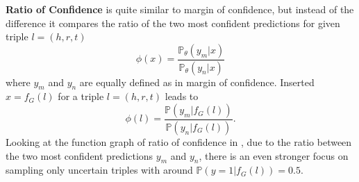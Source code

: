 \textbf{Ratio of Confidence}
is quite similar to margin of confidence, but instead of the difference it compares the ratio of the two most confident predictions for given triple $l = (h,r,t)$
\begin{equation}
    \phi(x) = \frac{\mathds{P}_{\theta}(y_m | x)}{\mathds{P}_{\theta}(y_n |x)}
\end{equation}
where $y_m$ and $y_n$ are equally defined as in margin of confidence.
Inserted $x = f_G(l)$ for a triple $l = (h,r,t)$ leads to
\begin{equation}
    \phi(l) = \frac{\mathds{P}(y_m |  f_G(l))}{\mathds{P}(y_n |f_G(l))}.
\end{equation}
Looking at the function graph of ratio of confidence in , due to the ratio between the two most confident predictions $y_m$ and $y_n$, there is an even stronger focus on sampling only uncertain triples with \ussoftmax around $\mathds{P}(y = 1 | f_G(l)) = 0.5$.